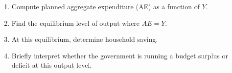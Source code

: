 \documentclass[12pt]{article}
\begin{document}
\begin{enumerate}
    \item[(a)] Compute planned aggregate expenditure (AE) as a function of $Y$.\\
    \item[(b)] Find the equilibrium level of output where $AE = Y$.\\
    \item[(c)] At this equilibrium, determine household saving.\\
    \item[(d)] Briefly interpret whether the government is running a budget surplus or deficit at this output level.\\
\end{enumerate}
\end{document}
